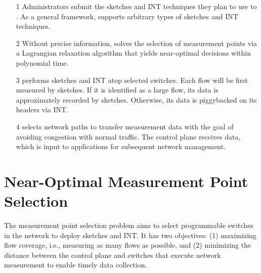 \begin{itemize}[leftmargin=*]
%
    \item[1] Administrators submit the sketches and INT techniques they plan to use to \sysname. As a general framework, \sysname supports arbitrary types of sketches and INT techniques. 
%
    \item[2] Without precise information, \sysname solves the selection of measurement points via a Lagrangian relaxation algorithm that yields near-optimal decisions within polynomial time.
%
    \item[3] \sysname performs sketches and INT atop selected switches. Each flow will be first measured by sketches. If it is identified as a large flow, its data is approximately recorded by sketches. Otherwise, its data is piggybacked on its headers via INT. 
%
%
    \item[4] \sysname selects network paths to transfer measurement data with the goal of avoiding congestion with normal traffic. The control plane receives data, which is input to applications for subsequent network management. 
%
\end{itemize}



\section{Near-Optimal Measurement Point Selection}\label{selection}

 The measurement point selection problem aims to select programmable switches in the network to deploy sketches and INT. It has two objectives: (1) maximizing flow coverage, i.e., measuring as many flows as possible, and (2) minimizing the distance between the control plane and switches that execute network measurement to enable timely data collection.

